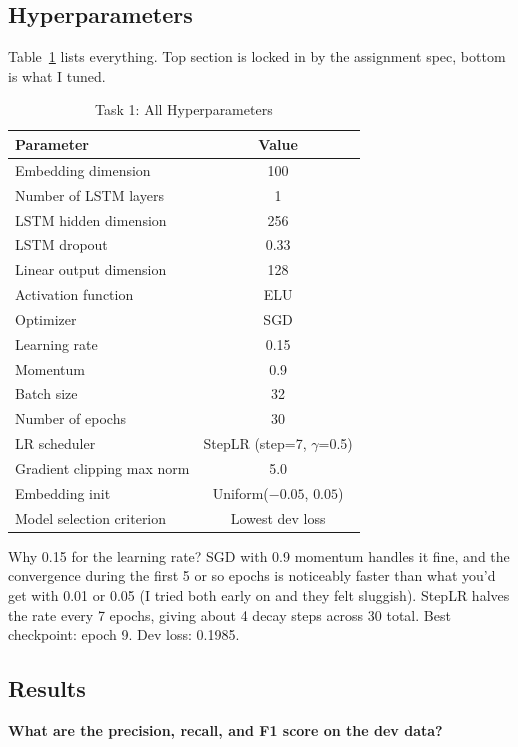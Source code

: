 \documentclass[11pt]{article}
\begin{document}
\subsection{Hyperparameters}

Table~\ref{tab:hp1} lists everything. Top section is locked in by the assignment spec, bottom is what I tuned.

\begin{table}[h]
\centering
\caption{Task 1: All Hyperparameters}
\label{tab:hp1}
\begin{tabular}{lc}
\toprule
\textbf{Parameter} & \textbf{Value} \\
\midrule
Embedding dimension & 100 \\
Number of LSTM layers & 1 \\
LSTM hidden dimension & 256 \\
LSTM dropout & 0.33 \\
Linear output dimension & 128 \\
Activation function & ELU \\
\midrule
Optimizer & SGD \\
Learning rate & 0.15 \\
Momentum & 0.9 \\
Batch size & 32 \\
Number of epochs & 30 \\
LR scheduler & StepLR (step=7, $\gamma$=0.5) \\
Gradient clipping max norm & 5.0 \\
Embedding init & Uniform($-0.05$, $0.05$) \\
Model selection criterion & Lowest dev loss \\
\bottomrule
\end{tabular}
\end{table}

Why 0.15 for the learning rate? SGD with 0.9 momentum handles it fine, and the convergence during the first 5 or so epochs is noticeably faster than what you'd get with 0.01 or 0.05 (I tried both early on and they felt sluggish). StepLR halves the rate every 7 epochs, giving about 4 decay steps across 30 total. Best checkpoint: epoch 9. Dev loss: 0.1985.

\subsection{Results}

\textbf{What are the precision, recall, and F1 score on the dev data?}
\end{document}
